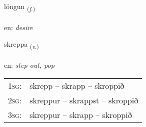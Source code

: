 \documentclass[frontgrid, backgrid]{flacards}\usepackage[]{graphicx}\usepackage[]{xcolor}
\begin{document}
\renewcommand{\flhead}{\vskip5pt \fboxsep=0pt {\small\bfseries\footnotesize Nafnorð | Noun}}
\renewcommand{\fcfoot}{\vskip5pt \fboxsep=0pt \hspace{2pt}{\small\bfseries\footnotesize 3K}}

\renewcommand{\blhead}{\vskip5pt {\small\bfseries\footnotesize Nafnorð | Noun }}
\renewcommand{\bcfoot}{\vskip5pt \hspace{2pt}{\small\bfseries\footnotesize 3K}}


{löngun \small{\textsubscript{(\textit{f.})}} \\[1ex] %
\textphonetic{[lœiŋkʏn]} \\
en: \emph{desire} \\  [2ex]
\renewcommand*{\arraystretch}{0.8}
}

\renewcommand{\flhead}{\vskip5pt \fboxsep=0pt {\small\bfseries\footnotesize Sagnorð | Verb}}
\renewcommand{\fcfoot}{\vskip5pt \fboxsep=0pt \hspace{2pt}{\small\bfseries\footnotesize 3K}}

\renewcommand{\blhead}{\vskip5pt {\small\bfseries\footnotesize Sagnorð | Verb }}
\renewcommand{\bcfoot}{\vskip5pt \hspace{2pt}{\small\bfseries\footnotesize 3K}}


{skreppa \small{\textsubscript{(\textit{v.})}} \\[1ex] %
\textphonetic{[skrɛhpa]} \\
en: \emph{step out, pop} \\  [2ex]
\renewcommand*{\arraystretch}{0.8}
\begin{tabular}{p{1cm}l}
\textsc{1sg}: & skrepp -- skrapp -- skroppið \\ 
\textsc{2sg}: & skreppur -- skrappst -- skroppið \\ 
\textsc{3sg}: & skreppur -- skrapp -- skroppið \\ 
\end{tabular}
}
\end{document}
